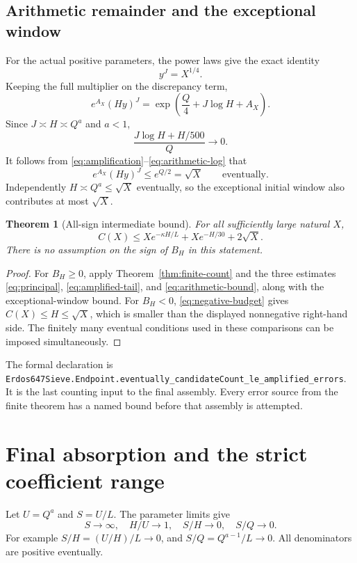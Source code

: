 \documentclass[11pt,a4paper]{article}
\newtheorem{theorem}{Theorem}[section]
\theoremstyle{definition}
\theoremstyle{remark}
\numberwithin{equation}{section}
\newcommand{\rate}{\kappa}
\newcommand{\leanname}[1]{{\small\nolinkurl{#1}}}
\begin{document}
\subsection{Arithmetic remainder and the exceptional window}
For the actual positive parameters, the power laws give the exact identity
\begin{equation}\label{eq:y-power}
 y^J=X^{1/4}.
\end{equation}
Keeping the full multiplier on the discrepancy term,
\begin{equation}\label{eq:arithmetic-log}
 e^{A_X}(Hy)^J
 =\exp\!\left(\frac Q4+J\log H+A_X\right).
\end{equation}
Since $J\asymp H\asymp Q^a$ and $a<1$,
\[
 \frac{J\log H+H/500}{Q}\longrightarrow0.
\]
It follows from \eqref{eq:amplification}--\eqref{eq:arithmetic-log} that
\begin{equation}\label{eq:arithmetic-bound}
 e^{A_X}(Hy)^J\le e^{Q/2}=\sqrt X\qquad\text{eventually}.
\end{equation}
Independently $H\asymp Q^a\le\sqrt X$ eventually, so the exceptional initial
window also contributes at most $\sqrt X$.

\begin{theorem}[All-sign intermediate bound]\label{thm:majorant}
For all sufficiently large natural $X$,
\begin{equation}\label{eq:majorant}
 \boxed{C(X)\le Xe^{-\rate H/L}+Xe^{-H/30}+2\sqrt X.}
\end{equation}
There is no assumption on the sign of $B_H$ in this statement.
\end{theorem}
\begin{proof}
For $B_H\ge0$, apply Theorem~\ref{thm:finite-count} and the three estimates
\eqref{eq:principal}, \eqref{eq:amplified-tail}, and
\eqref{eq:arithmetic-bound}, along with the exceptional-window bound.
For $B_H<0$, \eqref{eq:negative-budget} gives $C(X)\le H\le\sqrt X$, which is
smaller than the displayed nonnegative right-hand side. The finitely many
eventual conditions used in these comparisons can be imposed simultaneously.
\end{proof}
The formal declaration is
\leanname{Erdos647Sieve.Endpoint.eventually_candidateCount_le_amplified_errors}.
It is the last counting input to the final assembly. Every error source from
the finite theorem has a named bound before that assembly is attempted.

\section{Final absorption and the strict coefficient range}\label{sec:absorption}
Let $U=Q^a$ and $S=U/L$. The parameter limits give
\begin{equation}\label{eq:absorption-scales}
 S\to\infty,\quad H/U\to1,\quad S/H\to0,\quad S/Q\to0.
\end{equation}
For example $S/H=(U/H)/L\to0$, and $S/Q=Q^{a-1}/L\to0$.
All denominators are positive eventually.
\end{document}
